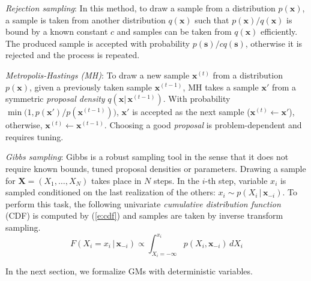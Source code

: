 \documentclass[letterpaper]{article}
\newcommand{\bvec}[1]{\textbf{#1}}
\newcommand{\pr}{p}
\begin{document}
\emph{Rejection sampling}: In this method, to draw a sample from 
a distribution $p(\bvec{x})$, a sample is taken from another distribution $q(\bvec{x})$
such that $p(\bvec{x})/q(\bvec{x})$ is bound by a known constant $c$
and samples can be taken from $q(\bvec{x})$ efficiently.
The produced sample is accepted with probability $p(\bvec{s}) / c q(\bvec{s})$, 
otherwise it is rejected and the process is repeated. 

\emph{Metropolis-Hastings (MH)}:
To draw a new sample $\bvec{x}^{(t)}$ from a distribution $p(\bvec{x})$, given a previously taken sample $\bvec{x}^{(t-1)}$, 
MH takes a sample $\bvec{x}'$ from a symmetric \emph{proposal density} $q(\bvec{x} |\, \bvec{x}^{(t-1)})$. 
With probability $\min \big(1, p(\bvec{x}')/p(\bvec{x}^{(t-1)}) \big)$, 
$\bvec{x}'$ is accepted as the next sample ($\bvec{x}^{(t)} \leftarrow \bvec{x}'$), otherwise, $\bvec{x}^{(t)} \leftarrow \bvec{x}^{(t-1)}$. 
Choosing a good \emph{proposal} is problem-dependent and requires tuning. 


\emph{Gibbs sampling}:
Gibbs is a robust sampling tool in the sense that it does not require known bounds, tuned proposal densities or parameters.
Drawing a sample for $\bvec{X} = (X_1, \ldots, X_N)$ takes place in $N$ steps.
In the $i$-th step, variable $x_i$ is sampled conditioned on the last realization of the others:
$x_i \sim \pr(X_i \,|\, \bvec{x}_{-i})$. 
To perform this task, the following univariate \emph{cumulative distribution function} (CDF)
is computed by (\ref{e:cdf}) and samples are taken by inverse transform sampling. 
\begin{equation}
\label{e:cdf}
F(X_i = x_i \,|\, \bvec{x}_{-i}) 
\propto
\int_{X_i= -\infty}^{x_i} \!\!\!\!\!\!\!\!\!\! \pr(X_i , \bvec{x}_{-i}) \, d  X_i
\end{equation} 

In the next section, we formalize GMs with deterministic variables. 
\end{document}
